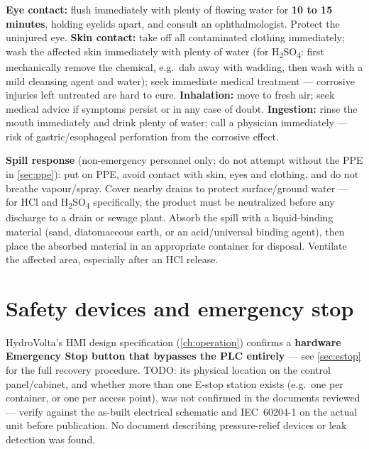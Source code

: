\documentclass[a4paper,11pt,twoside,openright,numbers=noenddot]{scrreprt}
\begin{document}
\begin{danger}
\textbf{Eye contact:} flush immediately with plenty of flowing water for
\textbf{10 to 15 minutes}, holding eyelids apart, and consult an
ophthalmologist. Protect the uninjured eye. \textbf{Skin contact:} take
off all contaminated clothing immediately; wash the affected skin
immediately with plenty of water (for H\textsubscript{2}SO\textsubscript{4}:
first mechanically remove the chemical, e.g.\ dab away with wadding, then
wash with a mild cleansing agent and water); seek immediate medical
treatment --- corrosive injuries left untreated are hard to cure.
\textbf{Inhalation:} move to fresh air; seek medical advice if symptoms
persist or in any case of doubt. \textbf{Ingestion:} rinse the mouth
immediately and drink plenty of water; call a physician immediately ---
risk of gastric/esophageal perforation from the corrosive effect.
\end{danger}

\textbf{Spill response} (non-emergency personnel only; do not attempt
without the PPE in \cref{sec:ppe}): put on PPE, avoid contact with skin,
eyes and clothing, and do not breathe vapour/spray. Cover nearby drains to
protect surface/ground water --- for HCl and H\textsubscript{2}SO\textsubscript{4}
specifically, the product must be neutralized before any discharge to a
drain or sewage plant. Absorb the spill with a liquid-binding material
(sand, diatomaceous earth, or an acid/universal binding agent), then place
the absorbed material in an appropriate container for disposal. Ventilate
the affected area, especially after an HCl release.

\section{Safety devices and emergency stop}
HydroVolta's HMI design specification (\cref{ch:operation}) confirms a
\textbf{hardware Emergency Stop button that bypasses the PLC entirely} ---
see \cref{sec:estop} for the full recovery procedure. TODO: its physical
location on the control panel/cabinet, and whether more than one E-stop
station exists (e.g.\ one per container, or one per access point), was
not confirmed in the documents reviewed --- verify against the as-built
electrical schematic and IEC~60204-1 on the actual unit before
publication. No document describing pressure-relief devices or leak
detection was found.
\end{document}
